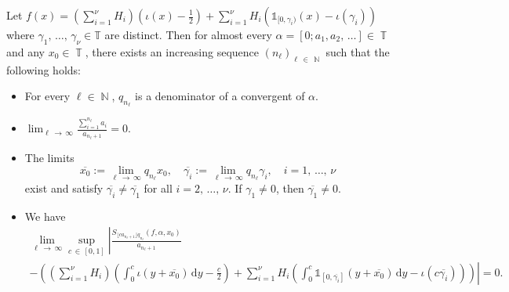 \documentclass[AHL,Unicode,longabstracts,published]{cedram}
\DeclareMathOperator{\N}{\mathbb{N}}
\DeclareMathOperator{\T}{\mathbb{T}}
\newcommand{\bbT}{\mathbb{T}}
\newcommand{\rmd}{\mathrm{d}}
\newcommand{\kj}{n_{\ell}}
\newcommand{\bbT}{\mathbb{T}}
\begin{document}
\begin{lemm}\label{indicator_lem}
Let $f(x) =(\sum_{i=1}^{\nu} H_i) (\iota(x) - \frac{1}{2}) + \sum_{i=1}^{\nu} H_i (\mathds{1}_{[0, \gamma_i)} (x) - \iota(\gamma_i))$ where $\gamma_1,\,\ldots,\,\gamma_{\nu} \in \bbT$ are distinct. Then for almost every $\alpha = [0;a_1,a_2,\,\ldots] \in \T$ and any $x_0 \in \T$, there exists an increasing sequence $({\kj})_{\ell\,\in\,\N}$ such that the following holds:
\begin{itemize}
\item For every $\ell \in \N$, $q_{\kj}$ is a denominator of a convergent of $\alpha$.
\item $\lim_{\ell\,\to\,\infty} \frac{\sum_{i =1}^{\kj} a_i }{a_{\kj+1}} = 0$.
\item The limits
\[
\overline{x_0} := \lim_{\ell\,\to\,\infty} q_{\kj}x_0, \quad \overline{\gamma_i} := \lim_{\ell\,\to\,\infty} q_{\kj}\gamma_i, \quad i = 1,\,\ldots,\,\nu \quad
\]
exist and satisfy $\overline{\gamma_i} \neq \overline{\gamma_1}$ for all $i = 2,\,\ldots,\,\nu$. If $\gamma_1 \neq 0$, then $\overline{\gamma_1} \neq 0$.
\item We have
\begin{multline}\label{def_of_g}
\lim_{\ell\,\to\,\infty}
\sup_{c\,\in\,[0,1]} \left\vert
\frac{S_{ \lfloor c a_{\kj+1}\rfloor q_{\kj} }(f,\alpha,x_0)}{a_{\kj+1}}\right. \\
-\left. \left(\left(\sum_{i = 1}^{\nu} H_i \right) \left(\int_{0}^{c} \iota(y + \overline{x_0}) \, \rmd y - \frac{c}{2}\right) 
+ \sum_{i = 1}^{\nu} H_i\left(\int_{0}^{c} \mathds{1}_{\left[0, \overline{\gamma_i}\right]}\left(y + \overline{x_0}\right) \,\rmd y - \iota(c\overline{\gamma_i})\right)\right)\right\vert = 0.
\end{multline}
\end{itemize}
\end{lemm}
\end{document}
